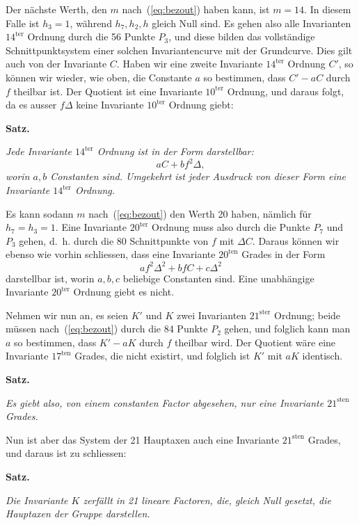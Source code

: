 \documentclass[12pt,a4paper]{article}
\begin{document}
Der n\"achste Werth, den $m$ nach~(\ref{eq:bezout}) haben kann, ist $m = 14$. In diesem Falle ist $h_3 = 1$, w\"ahrend $h_7, h_2, h$ gleich Null sind. Es gehen also alle Invarianten $14^{\text{ter}}$ Ordnung durch die 56 Punkte $P_3$, und diese bilden das vollst\"andige Schnittpunktsystem einer solchen Invariantencurve mit der Grundcurve. Dies gilt auch von der Invariante $C$. Haben wir eine zweite Invariante $14^{\text{ter}}$ Ordnung $C'$, so k\"onnen wir wieder, wie oben, die Constante $a$ so bestimmen, dass $C' - aC$ durch $f$ theilbar ist. Der Quotient ist eine Invariante $10^{\text{ter}}$ Ordnung, und daraus folgt, da es ausser $f\Delta$ keine Invariante $10^{\text{ter}}$ Ordnung giebt:

\begin{center}\textbf{Satz.}\end{center}
\textit{Jede Invariante $14^{\text{ter}}$ Ordnung ist in der Form darstellbar:
\[aC + bf^2\Delta,\]
worin $a, b$ Constanten sind. Umgekehrt ist jeder Ausdruck von dieser Form eine Invariante $14^{\text{ter}}$ Ordnung.}

Es kann sodann $m$ nach~(\ref{eq:bezout}) den Werth 20 haben, n\"amlich f\"ur $h_7 = h_3 = 1$. Eine Invariante $20^{\text{ter}}$ Ordnung muss also durch die Punkte $P_7$ und $P_3$ gehen, d.~h. durch die 80 Schnittpunkte von $f$ mit $\Delta C$. Daraus k\"onnen wir ebenso wie vorhin schliessen, dass eine Invariante $20^{\text{ten}}$ Grades in der Form
\[af^2\Delta^2 + bfC + c\Delta^2\]
darstellbar ist, worin $a, b, c$ beliebige Constanten sind. Eine unabh\"angige Invariante $20^{\text{ter}}$ Ordnung giebt es nicht.

Nehmen wir nun an, es seien $K'$ und $K$ zwei Invarianten $21^{\text{ster}}$ Ordnung; beide m\"ussen nach~(\ref{eq:bezout}) durch die 84 Punkte $P_2$ gehen, und folglich kann man $a$ so bestimmen, dass $K' - aK$ durch $f$ theilbar wird. Der Quotient w\"are eine Invariante $17^{\text{ten}}$ Grades, die nicht existirt, und folglich ist $K'$ mit $aK$ identisch.

\begin{center}\textbf{Satz.}\end{center}
\textit{Es giebt also, von einem constanten Factor abgesehen, nur eine Invariante $21^{\text{sten}}$ Grades.}

Nun ist aber das System der 21 Hauptaxen auch eine Invariante $21^{\text{sten}}$ Grades, und daraus ist zu schliessen:

\begin{center}\textbf{Satz.}\end{center}
\textit{Die Invariante $K$ zerf\"allt in 21 lineare Factoren, die, gleich Null gesetzt, die Hauptaxen der Gruppe darstellen.}
\end{document}
